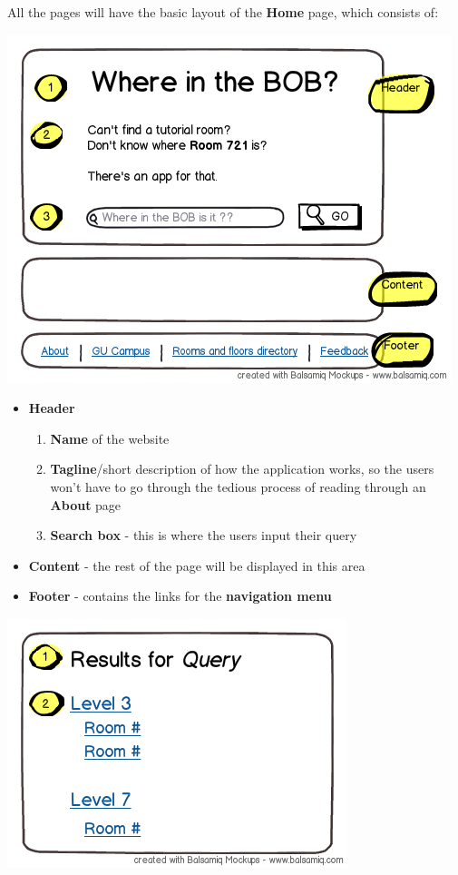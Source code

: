 \documentclass{sig-alt-release2}
\begin{document}
All the pages will have the basic layout of the \textbf{Home} page, which
consists of:
\begin{center}
\includegraphics[scale=0.55]{img/wireframes/home2.png}
\end{center}
\begin{itemize} \itemsep1pt \parskip0pt 
	\item{
		\textbf{Header}
		\begin{enumerate} \itemsep1pt \parskip0pt 
			\item{
				\textbf{Name} of the website
			}
			\item{
				\textbf{Tagline}/short description of how the application works, so
				the users won't have to go through the tedious process of
				reading through an \textbf{About} page
			}
			\item{
				\textbf{Search box} - this is where the users input their
				query
			}
		\end{enumerate}
	}

	\item{
		\textbf{Content} - the rest of the page will be displayed in this area
	}
	
	\item{\textbf{Footer} - contains the links for the \textbf{navigation menu}
	}
\end{itemize}


\begin{center}
\includegraphics[scale=0.5]{img/wireframes/results.png}
\end{center}
\end{document}
